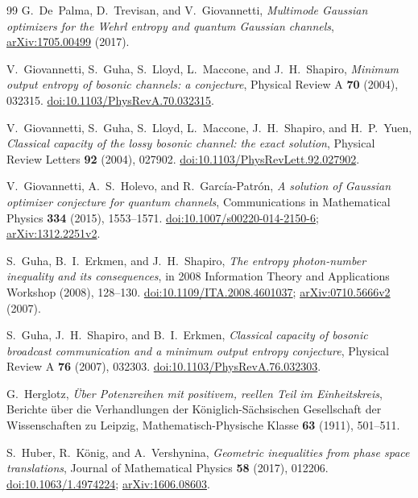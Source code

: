 \begin{thebibliography}{99}
G.~De~Palma, D.~Trevisan, and V.~Giovannetti,
\emph{Multimode Gaussian optimizers for the Wehrl entropy and quantum Gaussian channels},
\href{https://arxiv.org/abs/1705.00499}{arXiv:1705.00499} (2017).

V.~Giovannetti, S.~Guha, S.~Lloyd, L.~Maccone, and J.~H.~Shapiro,
\emph{Minimum output entropy of bosonic channels: a conjecture},
Physical Review A \textbf{70} (2004), 032315.
\href{https://doi.org/10.1103/PhysRevA.70.032315}{doi:10.1103/PhysRevA.70.032315}.

V.~Giovannetti, S.~Guha, S.~Lloyd, L.~Maccone, J.~H.~Shapiro, and H.~P.~Yuen,
\emph{Classical capacity of the lossy bosonic channel: the exact solution},
Physical Review Letters \textbf{92} (2004), 027902.
\href{https://doi.org/10.1103/PhysRevLett.92.027902}{doi:10.1103/PhysRevLett.92.027902}.

V.~Giovannetti, A.~S.~Holevo, and R.~Garc\'ia-Patr\'on,
\emph{A solution of Gaussian optimizer conjecture for quantum channels},
Communications in Mathematical Physics \textbf{334} (2015), 1553--1571.
\href{https://doi.org/10.1007/s00220-014-2150-6}{doi:10.1007/s00220-014-2150-6};
\href{https://arxiv.org/abs/1312.2251v2}{arXiv:1312.2251v2}.

S.~Guha, B.~I.~Erkmen, and J.~H.~Shapiro,
\emph{The entropy photon-number inequality and its consequences},
in 2008 Information Theory and Applications Workshop (2008), 128--130.
\href{https://doi.org/10.1109/ITA.2008.4601037}{doi:10.1109/ITA.2008.4601037};
\href{https://arxiv.org/abs/0710.5666v2}{arXiv:0710.5666v2} (2007).

S.~Guha, J.~H.~Shapiro, and B.~I.~Erkmen,
\emph{Classical capacity of bosonic broadcast communication and a minimum output entropy conjecture},
Physical Review A \textbf{76} (2007), 032303.
\href{https://doi.org/10.1103/PhysRevA.76.032303}{doi:10.1103/PhysRevA.76.032303}.

G.~Herglotz,
\emph{\"Uber Potenzreihen mit positivem, reellen Teil im Einheitskreis},
Berichte \"uber die Verhandlungen der K\"oniglich-S\"achsischen Gesellschaft
der Wissenschaften zu Leipzig, Mathematisch-Physische Klasse
\textbf{63} (1911), 501--511.

S.~Huber, R.~K\"onig, and A.~Vershynina,
\emph{Geometric inequalities from phase space translations},
Journal of Mathematical Physics \textbf{58} (2017), 012206.
\href{https://doi.org/10.1063/1.4974224}{doi:10.1063/1.4974224};
\href{https://arxiv.org/abs/1606.08603}{arXiv:1606.08603}.


\end{thebibliography}
